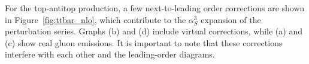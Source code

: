 
%
%
%
%

%
%
%
%

For the top-antitop production, a few next-to-leading order corrections are shown in Figure~\ref{fig:ttbar_nlo}, which contribute to
the $\alpha_S^3$ expansion of the perturbation series. Graphs (b) and (d) include virtual corrections, while (a) and (c) show real
gluon emissions. It is important to note that these corrections interfere with each other and the leading-order diagrams.

